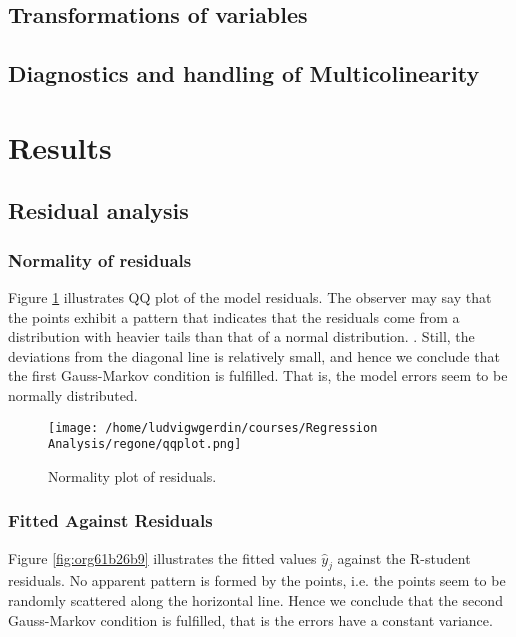 \documentclass[11pt]{article}
\begin{document}
\subsection{Transformations of variables}
\label{sec:orge03c0ac}
\subsection{Diagnostics and handling of Multicolinearity}
\label{sec:org8ea7105}
\section{Results}
\label{sec:orgb180d7e}
\subsection{Residual analysis}
\label{sec:org64f5761}
\subsubsection{Normality of residuals}
\label{sec:org1bcb1fb}

Figure \ref{fig:orgd7aa98f} illustrates QQ plot of the model residuals. The observer may say that the 
points exhibit a pattern that indicates that the residuals come from a distribution with heavier tails
than that of a normal distribution. 
\cite{Montgomery2012}. Still, the deviations from the diagonal line is relatively small, and hence
we conclude that the first Gauss-Markov condition is fulfilled. That is, the model errors seem to be 
normally distributed.

\begin{figure}[htbp]
\centering
\texttt{[image: /home/ludvigwgerdin/courses/Regression Analysis/regone/qqplot.png]}
\caption{\label{fig:orgd7aa98f}
Normality plot of residuals.}
\end{figure}

\subsubsection{Fitted Against Residuals}
\label{sec:org48c1493}

Figure \ref{fig:org61b26b9} illustrates the fitted values \(\hat y_j\) against the R-student residuals. No apparent 
pattern is formed by the points, i.e. the points seem to be randomly scattered along the horizontal line.
Hence we conclude that the second Gauss-Markov condition is fulfilled, that is the errors have a constant 
variance.
\end{document}
